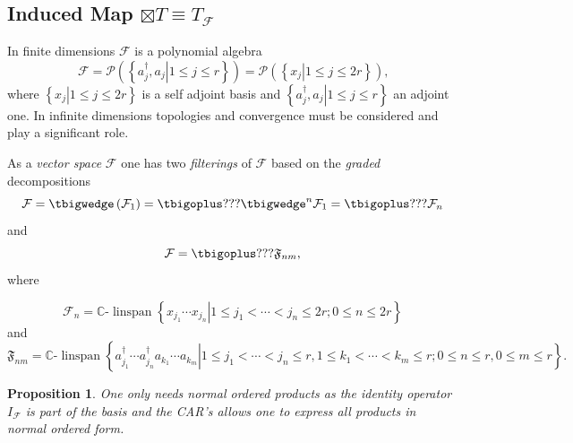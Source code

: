 \documentclass[aps, preprint]{revtex4}
\newtheorem{proposition}[theorem]{Proposition}
\begin{document}
\subsection{Induced Map $ \boxtimes T \equiv T_{\mathcal{F}}$}
In finite dimensions $\mathcal{F}$ is a polynomial algebra
\begin{equation}\mathcal{F} =\mathcal{P} \left (\left \{\left .a_{j}^{ \dag } ,a_{j}\right \vert 1 \leq j \leq r\right \}\right ) =\mathcal{P} \left (\left \{\left .x_{j}\right \vert 1 \leq j \leq 2 r\right \}\right )\text{,}
\end{equation}where $\left \{\left .x_{j}\right \vert 1 \leq j \leq 2 r\right \}$ is a self adjoint basis and $\left \{\left .a_{j}^{ \dag } ,a_{j}\right \vert 1 \leq j \leq r\right \}$ an adjoint one. In infinite dimensions topologies and convergence must be considered and play a significant role. 

As
a \emph{vector space} $\mathcal{F}$ one has two \emph{filterings }of $\mathcal{F}$ based on the \emph{graded} decompositions \emph{\ }
\begin{equation}\mathcal{F} = \tbigwedge \left (\mathcal{F}_{1}\right ) =\tbigoplus ??? \tbigwedge ^{n}\mathcal{F}_{1} =\tbigoplus ???\mathcal{F}_{n}
\end{equation}and
\begin{equation}\mathcal{F} =\tbigoplus ???\mathfrak{F}_{n m}\text{,}
\end{equation}where 

\begin{equation}\mathcal{F}_{n} =\mathbb{C}\text{-}\ensuremath{\operatorname*{linspan}}\left \{\left .x_{j_{1}} \cdots  x_{j_{n}}\right \vert 1 \leq j_{1} <\cdots  <j_{n} \leq 2 r ;0 \leq n \leq 2 r\right \}
\end{equation}and
\begin{equation}\mathfrak{F}_{n m} =\mathbb{C}\text{-}\ensuremath{\operatorname*{linspan}}\left \{\left .a_{j_{1}}^{ \dag } \cdots  a_{j_{n}}^{ \dag } a_{k_{1}} \cdots  a_{k_{m}}\right \vert 1 \leq j_{1} <\cdots  <j_{n} \leq r ,1 \leq k_{1} <\cdots  <k_{m} \leq r ;0 \leq n \leq r ,0 \leq m \leq r\right \}\text{.}
\end{equation}


\begin{proposition}
One only needs \emph{normal} ordered products as the identity operator $I_{\mathcal{F}}$ is part of the basis and the CAR's allows one to express all products in \emph{normal} ordered form. 
\end{proposition}
\end{document}
